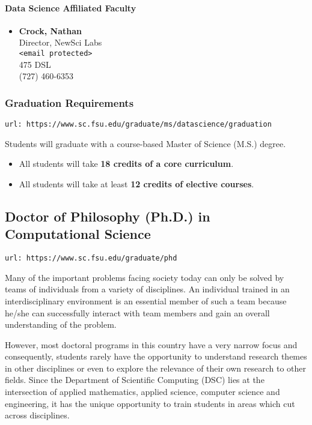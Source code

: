 \documentclass[12pt,a4paper]{article}
\begin{document}
\paragraph{Data Science Affiliated Faculty}
\begin{itemize}
    \item \textbf{Crock, Nathan} \\ Director, NewSci Labs \\ \texttt{<email protected>} \\ 475 DSL \\ (727) 460-6353
\end{itemize}

\subsubsection{Graduation Requirements}
\texttt{url: https://www.sc.fsu.edu/graduate/ms/datascience/graduation}

Students will graduate with a course-based Master of Science (M.S.) degree.
\begin{itemize}
    \item All students will take \textbf{18 credits of a core curriculum}.
    \item All students will take at least \textbf{12 credits of elective courses}.
\end{itemize}

\subsection{Doctor of Philosophy (Ph.D.) in Computational Science}
\texttt{url: https://www.sc.fsu.edu/graduate/phd}

Many of the important problems facing society today can only be solved by teams of individuals from a variety of disciplines. An individual trained in an interdisciplinary environment is an essential member of such a team because he/she can successfully interact with team members and gain an overall understanding of the problem.

However, most doctoral programs in this country have a very narrow focus and consequently, students rarely have the opportunity to understand research themes in other disciplines or even to explore the relevance of their own research to other fields. Since the Department of Scientific Computing (DSC) lies at the intersection of applied mathematics, applied science, computer science and engineering, it has the unique opportunity to train students in areas which cut across disciplines.
\end{document}
